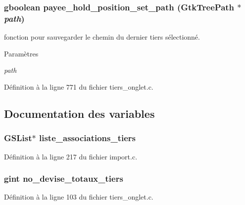 \subsubsection[{payee\_\-hold\_\-position\_\-set\_\-path}]{\setlength{\rightskip}{0pt plus 5cm}gboolean payee\_\-hold\_\-position\_\-set\_\-path (GtkTreePath $\ast$ {\em path})}\label{tiers__onglet_8c_a07d4064288024467a46893089d1a25c7}
fonction pour sauvegarder le chemin du dernier tiers sélectionné.


\begin{DoxyParams}{Paramètres}
\item[{\em path}]\end{DoxyParams}


Définition à la ligne 771 du fichier tiers\_\-onglet.c.



\subsection{Documentation des variables}
\subsubsection[{liste\_\-associations\_\-tiers}]{\setlength{\rightskip}{0pt plus 5cm}GSList$\ast$ {\bf liste\_\-associations\_\-tiers}}\label{tiers__onglet_8c_a8521224403aeb524822a05746e899bcf}


Définition à la ligne 217 du fichier import.c.

\subsubsection[{no\_\-devise\_\-totaux\_\-tiers}]{\setlength{\rightskip}{0pt plus 5cm}gint {\bf no\_\-devise\_\-totaux\_\-tiers}}\label{tiers__onglet_8c_a3add720d0e0b25caa37589bcfb879c6f}


Définition à la ligne 103 du fichier tiers\_\-onglet.c.

